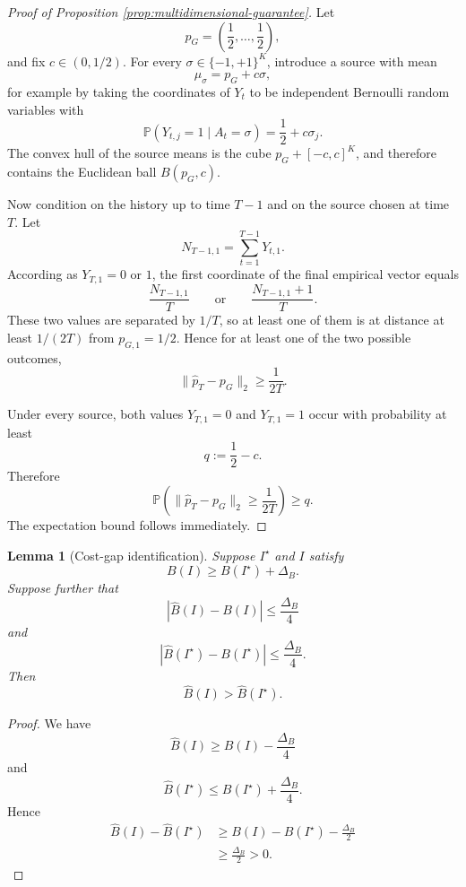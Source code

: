 \documentclass[twoside]{article}
\newtheorem{lemma}{Lemma}
\begin{document}
\begin{proof}[Proof of Proposition \ref{prop:multidimensional-guarantee}]
Let
\[
p_G=\left(\frac12,\ldots,\frac12\right),
\]
and fix \(c\in(0,1/2)\). For every
\(\sigma\in\{-1,+1\}^K\), introduce a source with mean
\[
\mu_\sigma=p_G+c\sigma,
\]
for example by taking the coordinates of \(Y_t\) to be independent
Bernoulli random variables with
\[
\mathbb P(Y_{t,j}=1\mid A_t=\sigma)
=\frac12+c\sigma_j.
\]
The convex hull of the source means is the cube
\(p_G+[-c,c]^K\), and therefore contains the Euclidean ball
\(B(p_G,c)\).

Now condition on the history up to time \(T-1\) and on the source chosen
at time \(T\). Let
\[
N_{T-1,1}=\sum_{t=1}^{T-1}Y_{t,1}.
\]
According as \(Y_{T,1}=0\) or \(1\), the first coordinate of the final
empirical vector equals
\[
\frac{N_{T-1,1}}{T}
\qquad\text{or}\qquad
\frac{N_{T-1,1}+1}{T}.
\]
These two values are separated by \(1/T\), so at least one of them is at
distance at least \(1/(2T)\) from \(p_{G,1}=1/2\). Hence for at least one
of the two possible outcomes,
\[
\|\widehat p_T-p_G\|_2\geq \frac{1}{2T}.
\]

Under every source, both values \(Y_{T,1}=0\) and \(Y_{T,1}=1\) occur with
probability at least
\[
q:=\frac12-c.
\]
Therefore
\[
\mathbb P\left(
\|\widehat p_T-p_G\|_2\geq \frac{1}{2T}
\right)\geq q.
\]
The expectation bound follows immediately.
\end{proof}

\begin{lemma}[Cost-gap identification]
\label{lem:cost-gap}
Suppose \(I^\star\) and \(I\) satisfy
\[
B(I)
\geq
B(I^\star)+\Delta_B.
\]
Suppose further that
\[
|\widehat B(I)-B(I)|
\leq
\frac{\Delta_B}{4}
\]
and
\[
|\widehat B(I^\star)-B(I^\star)|
\leq
\frac{\Delta_B}{4}.
\]
Then
\[
\widehat B(I)
>
\widehat B(I^\star).
\]
\end{lemma}

\begin{proof}
We have
\[
\widehat B(I)
\geq
B(I)-\frac{\Delta_B}{4}
\]
and
\[
\widehat B(I^\star)
\leq
B(I^\star)+\frac{\Delta_B}{4}.
\]
Hence
\[
\begin{aligned}
\widehat B(I)-\widehat B(I^\star)
&\geq
B(I)-B(I^\star)
-\frac{\Delta_B}{2}\\
&\geq
\frac{\Delta_B}{2}
>0.
\end{aligned}
\]
\end{proof}
\end{document}
